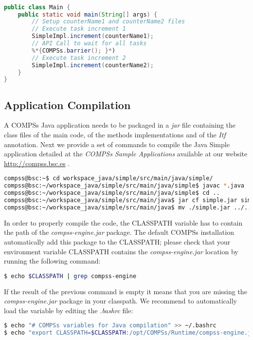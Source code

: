 \begin{lstlisting}[language=java]
%*{\bf import integratedtoolkit.api.COMPSs;}*)

public class Main {
    public static void main(String[] args) {
        // Setup counterName1 and counterName2 files
        // Execute task increment 1
        SimpleImpl.increment(counterName1);
        // API Call to wait for all tasks
        %*{COMPSs.barrier(); }*)
        // Execute task increment 2
        SimpleImpl.increment(counterName2);
    }
}
\end{lstlisting}



\subsection{Application Compilation}
A COMPSs Java application needs to be packaged in a \textit{jar} file containing the class files of the main code, of the methods implementations and of the \textit{Itf} annotation.
Next we provide a set of commands to compile the Java Simple application detailed at the \textit{COMPSs Sample Applications} 
available at our website \url{http://compss.bsc.es} .
\begin{lstlisting}[language=bash]
compss@bsc:~$ cd workspace_java/simple/src/main/java/simple/
compss@bsc:~/workspace_java/simple/src/main/java/simple$ javac *.java
compss@bsc:~/workspace_java/simple/src/main/java/simple$ cd ..
compss@bsc:~/workspace_java/simple/src/main/java$ jar cf simple.jar simple/
compss@bsc:~/workspace_java/simple/src/main/java$ mv ./simple.jar ../../../jar/
\end{lstlisting}

In order to properly compile the code, the CLASSPATH variable has to contain the path of the \textit{compss-engine.jar} package. The default COMPSs
installation automatically add this package to the CLASSPATH; please check that your environment variable CLASSPATH contains the \textit{compss-engine.jar} location by running the following command:
\begin{lstlisting}[language=bash]
$ echo $CLASSPATH | grep compss-engine
\end{lstlisting}
If the result of the previous command is empty it means that you are missing the \textit{compss-engine.jar} package in your classpath. 
We recommend to automatically load the variable by editing the \textit{.bashrc} file:
\begin{lstlisting}[language=bash]
$ echo "# COMPSs variables for Java compilation" >> ~/.bashrc
$ echo "export CLASSPATH=$CLASSPATH:/opt/COMPSs/Runtime/compss-engine.jar" >> ~/.bashrc
\end{lstlisting}


